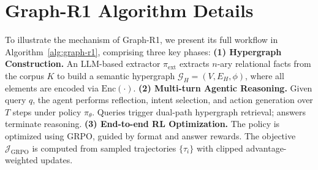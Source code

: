 \documentclass{article}
\theoremstyle{plain}
\theoremstyle{definition}
\theoremstyle{remark}
\begin{document}
\section{Graph-R1 Algorithm Details}
To illustrate the mechanism of Graph-R1, we present its full workflow in Algorithm~\ref{alg:graph-r1}, comprising three key phases:  
\textbf{(1) Hypergraph Construction.} An LLM-based extractor $\pi_{\text{ext}}$ extracts $n$-ary relational facts from the corpus $K$ to build a semantic hypergraph $\mathcal{G}_H = (V, E_H, \phi)$, where all elements are encoded via $\mathrm{Enc}(\cdot)$.  
\textbf{(2) Multi-turn Agentic Reasoning.} Given query $q$, the agent performs reflection, intent selection, and action generation over $T$ steps under policy $\pi_\theta$. Queries trigger dual-path hypergraph retrieval; answers terminate reasoning.  
\textbf{(3) End-to-end RL Optimization.} The policy is optimized using GRPO, guided by format and answer rewards. The objective $\mathcal{J}_{\text{GRPO}}$ is computed from sampled trajectories $\{\tau_i\}$ with clipped advantage-weighted updates.
\end{document}
